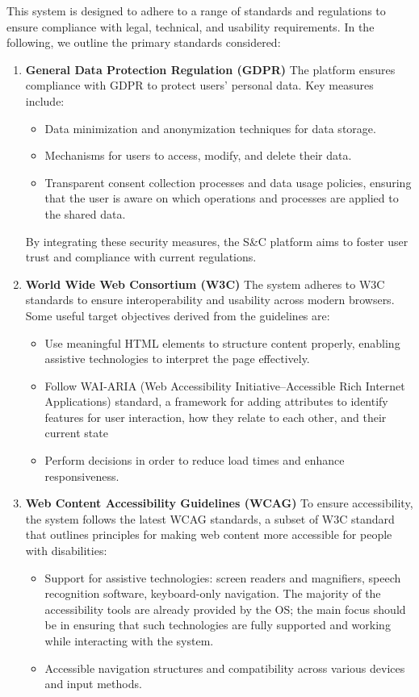 This system is designed to adhere to a range of standards and regulations to ensure compliance with legal, technical, and usability requirements. In the following, we outline the primary standards considered:

\begin{enumerate}
\item \textbf{General Data Protection Regulation (GDPR)}
The platform ensures compliance with GDPR to protect users’ personal data. Key measures include:
\begin{itemize}
    \item Data minimization and anonymization techniques for data storage.
    \item Mechanisms for users to access, modify, and delete their data.
    \item Transparent consent collection processes and data usage policies, ensuring that the user is aware on which operations and processes are applied to the shared data.
\end{itemize}
By integrating these security measures, the S\&C platform aims to foster user trust and compliance with current regulations.

\item \textbf{World Wide Web Consortium (W3C)}
The system adheres to W3C standards to ensure interoperability and usability across modern browsers. Some useful target objectives derived from the guidelines are:
\begin{itemize}
    \item Use meaningful HTML elements to structure content properly, enabling assistive technologies to interpret the page effectively.
    \item Follow WAI-ARIA (Web Accessibility Initiative–Accessible Rich Internet Applications) standard, a framework for adding attributes to identify features for user interaction, how they relate to each other, and their current state
    \item Perform decisions in order to reduce load times and enhance responsiveness.
\end{itemize}

\item \textbf{Web Content Accessibility Guidelines (WCAG)}
To ensure accessibility, the system follows the latest WCAG standards, a subset of W3C standard that outlines principles for making web content more accessible for people with disabilities:
\begin{itemize}
    \item Support for assistive technologies: screen readers and magnifiers, speech recognition software, keyboard-only navigation. The majority of the accessibility tools are already provided by the OS; the main focus should be in ensuring that such technologies are fully supported and working while interacting with the system.
    \item Accessible navigation structures and compatibility across various devices and input methods.
\end{itemize}
\end{enumerate}

